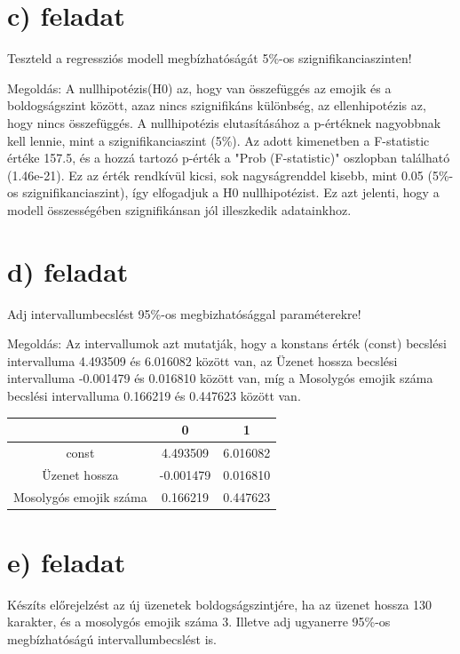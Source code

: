 \documentclass[11pt,a4paper,oneside]{report}
\begin{document}
\section{c) feladat}
Teszteld a regressziós modell megbízhatóságát 5\%-os szignifikanciaszinten!

Megoldás:
A nullhipotézis(H0) az, hogy van összefüggés az emojik és a boldogságszint között, azaz nincs szignifikáns különbség, az ellenhipotézis az, hogy nincs összefüggés. A nullhipotézis elutasításához a p-értéknek nagyobbnak kell lennie, mint a szignifikanciaszint (5\%).
Az adott kimenetben a F-statistic értéke 157.5, és a hozzá tartozó p-érték a "Prob (F-statistic)" oszlopban található (1.46e-21). Ez az érték rendkívül kicsi, sok nagyságrenddel kisebb, mint 0.05 (5\%-os szignifikanciaszint), így elfogadjuk a H0 nullhipotézist. Ez azt jelenti, hogy a modell összességében szignifikánsan jól illeszkedik adatainkhoz.


\section{d) feladat}
Adj intervallumbecslést 95\%-os megbizhatósággal paraméterekre!

Megoldás:
Az intervallumok azt mutatják, hogy a konstans érték (const) becslési intervalluma 4.493509 és 6.016082 között van,
az Üzenet hossza becslési intervalluma -0.001479 és 0.016810 között van,
míg a Mosolygós emojik száma becslési intervalluma 0.166219 és 0.447623 között van.

\begin{tabular}{|c|c|c|}
  \hline
                         & 0         & 1        \\
  \hline
  const                  & 4.493509  & 6.016082 \\
  \hline
  Üzenet hossza          & -0.001479 & 0.016810 \\
  \hline
  Mosolygós emojik száma & 0.166219  & 0.447623 \\
  \hline
\end{tabular}




\section{e) feladat}
Készíts előrejelzést az új üzenetek boldogságszintjére, ha az üzenet hossza 130 karakter,  és a mosolygós emojik száma 3. Illetve adj ugyanerre 95\%-os megbízhatóságú intervallumbecslést is.
\end{document}
